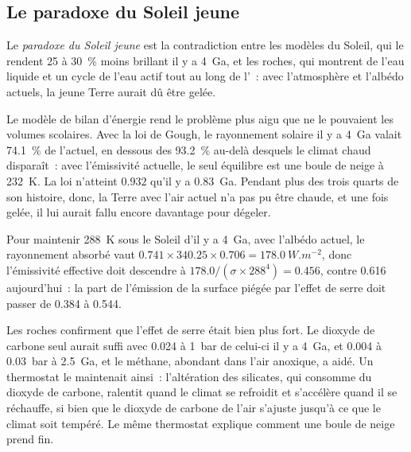 \subsection*{Le paradoxe du Soleil jeune}

\begin{definition}\label{def:b2:precambrian-earth:faint-sun}
Le \emph{paradoxe du Soleil jeune} est la contradiction entre
les modèles du Soleil, qui le rendent 25 à \qty{30}{\percent} moins brillant il y a \qty{4}{Ga}, et les
roches, qui montrent de l'eau liquide et un cycle de l'eau actif tout au long de l'~: avec l'atmosphère
et l'albédo actuels, la jeune Terre aurait dû être gelée.
\end{definition}

Le modèle de bilan d'énergie rend le problème plus aigu que ne le pouvaient les volumes scolaires. Avec la loi de Gough,
le rayonnement solaire il y a \qty{4}{Ga} valait \qty{74.1}{\percent} de l'actuel, en dessous des
\qty{93.2}{\percent} au-delà desquels le climat chaud disparaît~: avec l'émissivité actuelle, le seul
équilibre est une boule de neige à \qty{232}{K}. La loi n'atteint $0.932$ qu'il y a
\qty{0.83}{Ga}. Pendant plus des trois quarts de son histoire, donc, la Terre avec l'air actuel n'a pas pu être
chaude, et une fois gelée, il lui aurait fallu encore davantage pour dégeler.

\begin{example}\label{ex:b2:precambrian-earth:young-greenhouse}
Pour maintenir \qty{288}{K} sous le Soleil d'il y a \qty{4}{Ga}, avec l'albédo actuel, le rayonnement absorbé
vaut $0.741\times340.25\times0.706 = \qty{178.0}{W.m^{-2}}$, donc l'émissivité effective doit
descendre à $178.0/(\sigma\times288^4) = 0.456$, contre 0.616 aujourd'hui~: la part de l'émission de la surface
piégée par l'effet de serre doit passer de 0.384 à 0.544.
\end{example}

Les roches confirment que l'effet de serre était bien plus fort. Le dioxyde de carbone seul aurait suffi avec
0.024 à \qty{1}{bar} de celui-ci il y a \qty{4}{Ga}, et 0.004 à \qty{0.03}{bar} à \qty{2.5}{Ga}, et
le méthane, abondant dans l'air anoxique, a aidé. Un thermostat le maintenait ainsi~: l'altération des silicates,
qui consomme du dioxyde de carbone, ralentit quand le climat se refroidit et s'accélère quand il se réchauffe, si bien que le
dioxyde de carbone de l'air s'ajuste jusqu'à ce que le climat soit tempéré. Le même thermostat explique
comment une boule de neige prend fin.


